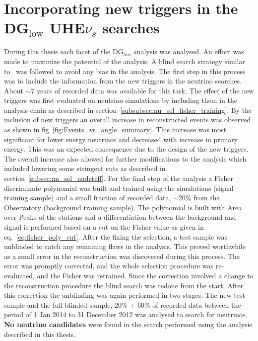 \section*{Incorporating new triggers in the DG$\mathrm{_{low}}$ UHE$\nu_s$ searches}
During this thesis each facet of the DG$_{low}$ analysis was analysed. An effort was made to maximize the potential of the analysis. A blind search strategy similar to~\cite{gap_note_2013,Aab_2019_diffuse} was followed to avoid any bias in the analysis. The first step in this process was to include the information from the new triggers in the neutrino searches. About $\sim$7 years of recorded data was available for this task. The effect of the new triggers was first evaluated on neutrino simulations by including them in the analysis chain as described in section~\ref{subsubsec:nu_sel_fisher_training}. By the inclusion of new triggers an overall increase in reconstructed events was observed as shown in fig~\ref{fig:Events_vs_angle_summary}. This increase was most significant for lower energy neutrinos and decreased with increase in primary energy. This was an expected consequence due to the design of the new triggers. The overall increase also allowed for further modifications to the analysis which included lowering some stringent cuts as described in section~\ref{subsec:nu_sel_nudeteff}. For the final step of the analysis a Fisher discriminate polynomial was built and trained using the simulations (signal training sample) and a small fraction of recorded data, $\sim$20\% from the Observatory (background training sample). The polynomial is built with Area over Peaks of the stations and a differentiation between the background and signal is performed based on a cut on the Fisher value as given in eq.~\ref{eq:fisher_poly_cut}.
After the fixing the selection, a test sample was unblinded to catch any remaining flaws in the analysis. This proved worthwhile as a small error in the reconstruction was discovered during this process. The error was promptly corrected, and the whole selection procedure was re-evaluated, and the Fisher was retrained. Since the correction involved a change to the reconstruction procedure the blind search was redone from the start. After this correction the unblinding was again performed in two stages. The new test sample and the full blinded sample, 20\% + 60\% of recorded data between the period of 1 Jan 2014 to 31 December 2012 was analysed to search for neutrinos. \textbf{No neutrino candidates} were found in the search performed using the analysis described in this thesis. 

